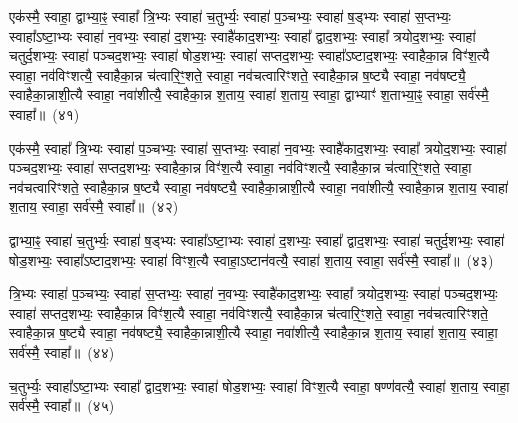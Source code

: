 {\anuvakamend[{अय॑च्छ॒दधि॑ रभते द्वादशा॒हेन॑ च॒त्वारि॑ च}]}%

एक॑स्मै॒ स्वाहा॒ द्वाभ्या॒ꣴ॒ स्वाहा᳚ त्रि॒भ्यः स्वाहा॑ च॒तुर्भ्यः॒ स्वाहा॑ प॒ञ्चभ्यः॒ स्वाहा॑ ष॒ड्भ्यः स्वाहा॑ स॒प्तभ्यः॒ स्वाहा᳚\-ऽष्टा॒भ्यः स्वाहा॑ न॒वभ्यः॒ स्वाहा॑ द॒शभ्यः॒ स्वाहै॑काद॒शभ्यः॒ स्वाहा᳚ द्वाद॒शभ्यः॒ स्वाहा᳚ त्रयोद॒शभ्यः॒ स्वाहा॑ चतुर्द॒शभ्यः॒ स्वाहा॑ पञ्चद॒शभ्यः॒ स्वाहा॑ षोड॒शभ्यः॒ स्वाहा॑ सप्तद॒शभ्यः॒ स्वाहा᳚\-ऽष्टाद॒शभ्यः॒ स्वाहैका॒न्न विꣳ॑श॒त्यै स्वाहा॒ नव॑विꣳशत्यै॒ स्वाहैका॒न्न च॑त्वारि॒ꣳ॒शते॒ स्वाहा॒ नव॑चत्वारिꣳशते॒ स्वाहैका॒न्न ष॒ष्ट्यै स्वाहा॒ नव॑षष्ट्यै॒ स्वाहैका॒न्नाशी॒त्यै स्वाहा॒ नवा॑शीत्यै॒ स्वाहैका॒न्न श॒ताय॒ स्वाहा॑ श॒ताय॒ स्वाहा॒ द्वाभ्याꣳ॑ श॒ताभ्या॒ꣴ॒ स्वाहा॒ सर्व॑स्मै॒ स्वाहा᳚॥~(४१)

{}%

एक॑स्मै॒ स्वाहा᳚ त्रि॒भ्यः स्वाहा॑ प॒ञ्चभ्यः॒ स्वाहा॑ स॒प्तभ्यः॒ स्वाहा॑ न॒वभ्यः॒ स्वाहै॑काद॒शभ्यः॒ स्वाहा᳚ त्रयोद॒शभ्यः॒ स्वाहा॑ पञ्चद॒शभ्यः॒ स्वाहा॑ सप्तद॒शभ्यः॒ स्वाहैका॒न्न विꣳ॑श॒त्यै स्वाहा॒ नव॑विꣳशत्यै॒ स्वाहैका॒न्न च॑त्वारि॒ꣳ॒शते॒ स्वाहा॒ नव॑चत्वारिꣳशते॒ स्वाहैका॒न्न ष॒ष्ट्यै स्वाहा॒ नव॑षष्ट्यै॒ स्वाहैका॒न्नाशी॒त्यै स्वाहा॒ नवा॑शीत्यै॒ स्वाहैका॒न्न श॒ताय॒ स्वाहा॑ श॒ताय॒ स्वाहा॒ सर्व॑स्मै॒ स्वाहा᳚॥~(४२)

{\anuvakamend[{एक॑स्मै त्रि॒भ्यः प॑ञ्चा॒शत्}]}%

द्वाभ्या॒ꣴ॒ स्वाहा॑ च॒तुर्भ्यः॒ स्वाहा॑ ष॒ड्भ्यः स्वाहा᳚\-ऽष्टा॒भ्यः स्वाहा॑ द॒शभ्यः॒ स्वाहा᳚ द्वाद॒शभ्यः॒ स्वाहा॑ चतुर्द॒शभ्यः॒ स्वाहा॑ षोड॒शभ्यः॒ स्वाहा᳚\-ऽष्टाद॒शभ्यः॒ स्वाहा॑ विꣳश॒त्यै स्वाहा॒\-ऽष्टान॑वत्यै॒ स्वाहा॑ श॒ताय॒ स्वाहा॒ सर्व॑स्मै॒ स्वाहा᳚॥~(४३)

{\anuvakamend[{द्वाभ्या॑म॒ष्टान॑वत्यै॒ षड्विꣳ॑शतिः}]}%

त्रि॒भ्यः स्वाहा॑ प॒ञ्चभ्यः॒ स्वाहा॑ स॒प्तभ्यः॒ स्वाहा॑ न॒वभ्यः॒ स्वाहै॑काद॒शभ्यः॒ स्वाहा᳚ त्रयोद॒शभ्यः॒ स्वाहा॑ पञ्चद॒शभ्यः॒ स्वाहा॑ सप्तद॒शभ्यः॒ स्वाहैका॒न्न विꣳ॑श॒त्यै स्वाहा॒ नव॑विꣳशत्यै॒ स्वाहैका॒न्न च॑त्वारि॒ꣳ॒शते॒ स्वाहा॒ नव॑चत्वारिꣳशते॒ स्वाहैका॒न्न ष॒ष्ट्यै स्वाहा॒ नव॑षष्ट्यै॒ स्वाहैका॒न्नाशी॒त्यै स्वाहा॒ नवा॑शीत्यै॒ स्वाहैका॒न्न श॒ताय॒ स्वाहा॑ श॒ताय॒ स्वाहा॒ सर्व॑स्मै॒ स्वाहा᳚॥~(४४)

{\anuvakamend[{त्रि॒भ्यो᳚\-ऽष्टाचत्वारि॒ꣳ॒शत्}]}%

च॒तुर्भ्यः॒ स्वाहा᳚\-ऽष्टा॒भ्यः स्वाहा᳚ द्वाद॒शभ्यः॒ स्वाहा॑ षोड॒शभ्यः॒ स्वाहा॑ विꣳश॒त्यै स्वाहा॒ षण्ण॑वत्यै॒ स्वाहा॑ श॒ताय॒ स्वाहा॒ सर्व॑स्मै॒ स्वाहा᳚॥~(४५)

